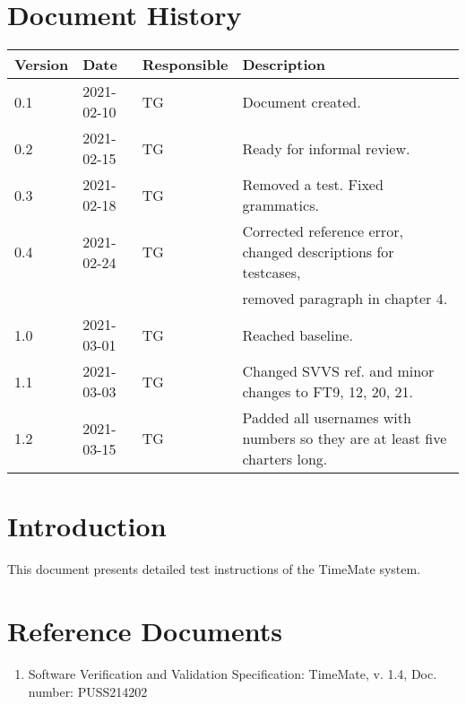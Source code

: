 \documentclass{article}
\date {#1}
\title {
    \documentNumber {03}    
    
    \documentVersion {1.2}
    
    \documentTitle {Software Verification and Validation Instructions}
    \documentGroup {2}
 
    \documentResponsible {Test Group}
    \documentAuthors {Test Group}
    
    \documentDate {2021-03-15}
}
\begin{document}
\maketitle
\thispagestyle{empty}

\newpage

\tableofcontents

\newpage


\section{Document History}
\begin{tabular}{ l | l | l | l }
    Version & Date & Responsible & Description \\
    \hline
   0.1 & 2021-02-10 & TG & Document created. \\
   0.2 & 2021-02-15 & TG & Ready for informal review. \\
   0.3 & 2021-02-18 & TG & Removed a test. Fixed grammatics. \\
   0.4 & 2021-02-24 & TG & Corrected reference error, changed descriptions for testcases,  \\
       &            &   &   removed paragraph in chapter 4. \\
   1.0 & 2021-03-01 & TG & Reached baseline. \\ 
   1.1 & 2021-03-03 & TG & Changed SVVS ref. and minor changes to FT9, 12, 20, 21.\\
   1.2 & 2021-03-15 & TG & Padded all usernames with numbers so they are at least five charters long. \\   
\end{tabular}

\section{Introduction}
This document presents detailed test instructions of the  TimeMate system.

\section{Reference Documents}
\begin{enumerate}
	\item Software Verification and Validation Specification: 	TimeMate, v. 1.4, Doc. number: PUSS214202
\end{enumerate}
\end{document}
